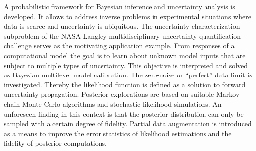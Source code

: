 A probabilistic framework for Bayesian inference and uncertainty analysis is developed.
It allows to address inverse problems in experimental situations where data is scarce and uncertainty is ubiquitous.
The uncertainty characterization subproblem of the NASA Langley multidisciplinary uncertainty quantification challenge serves as the motivating application example.
From responses of a computational model the goal is to learn about unknown model inputs that are subject to multiple types of uncertainty.
This objective is interpreted and solved as Bayesian multilevel model calibration.
The zero-noise or ``perfect'' data limit is investigated.
Thereby the likelihood function is defined as a solution to forward uncertainty propagation.
Posterior explorations are based on suitable Markov chain Monte Carlo algorithms and stochastic likelihood simulations.
An unforeseen finding in this context is that the posterior distribution can only be sampled with a certain degree of fidelity.
Partial data augmentation is introduced as a means to improve the error statistics of likelihood estimations and the fidelity of posterior computations.